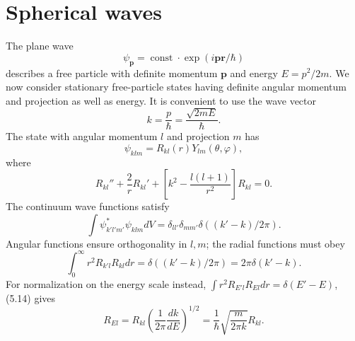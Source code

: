 \section{Spherical waves}

The plane wave
\[\psi_{\mathbf p}=\operatorname{const}\cdot\exp(i\mathbf p\mathbf r/\hbar)\]
describes a free particle with definite momentum $\mathbf p$ and energy
$E=p^2/2m$. We now consider stationary free-particle states having definite
angular momentum and projection as well as energy. It is convenient to use
the wave vector
\begin{equation}k=\frac p\hbar=\frac{\sqrt{2mE}}\hbar.\tag{33.1}\end{equation}
The state with angular momentum $l$ and projection $m$ has
\begin{equation}\psi_{klm}=R_{kl}(r)Y_{lm}(\theta,\varphi),\tag{33.2}\end{equation}
where
\begin{equation}
 R_{kl}''+\frac2rR_{kl}'+\left[k^2-\frac{l(l+1)}{r^2}\right]R_{kl}=0.\tag{33.3}
\end{equation}
The continuum wave functions satisfy
\[
 \int\psi_{k'l'm'}^*\psi_{klm}dV
 =\delta_{ll'}\delta_{mm'}\delta((k'-k)/2\pi).
\]
Angular functions ensure orthogonality in $l,m$; the radial functions must
obey
\begin{equation}
 \int_0^\infty r^2R_{k'l}R_{kl}dr=\delta((k'-k)/2\pi)
 =2\pi\delta(k'-k).\tag{33.4}
\end{equation}
For normalization on the energy scale instead,
$\int r^2R_{E'l}R_{El}dr=\delta(E'-E)$, (5.14) gives
\begin{equation}
 R_{El}=R_{kl}\left(\frac1{2\pi}\frac{dk}{dE}\right)^{1/2}
 =\frac1\hbar\sqrt{\frac{m}{2\pi k}}R_{kl}.\tag{33.5}
\end{equation}

